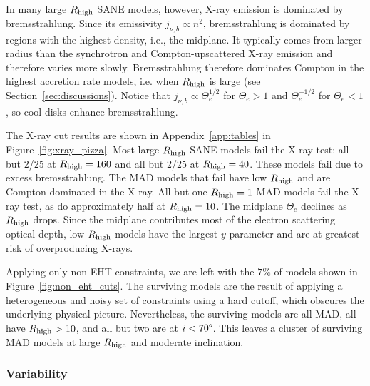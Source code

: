 In many large $R_\mathrm{high}$ SANE models, however, X-ray emission is dominated by bremsstrahlung.
Since its emissivity $j_{\nu,b} \propto n^2$, bremsstrahlung is dominated by regions with the highest density, i.e., the midplane.
It typically comes from larger radius than the synchrotron and Compton-upscattered X-ray emission and therefore varies more slowly.
Bremsstrahlung therefore dominates Compton in the highest accretion rate models, i.e. when $R_\mathrm{high}$ is large (see Section~\ref{sec:discussions}).
Notice that $j_{\nu,b} \propto \Theta_e^{1/2}$ for $\Theta_e > 1$ and $\Theta_e^{-1/2}$ for $\Theta_e < 1$, so cool disks enhance bremsstrahlung.

The X-ray cut results are shown in Appendix~\ref{app:tables} in Figure~\ref{fig:xray_pizza}.
Most large $R_\mathrm{high}$ SANE models fail the X-ray test: all but 2/25 at $R_\mathrm{high} = 160$ and all but 2/25 at $R_\mathrm{high} = 40$.
These models fail due to excess bremsstrahlung.
The MAD models that fail have low $R_\mathrm{high}$ and are Compton-dominated in the X-ray.
All but one $R_\mathrm{high} = 1$ MAD models fail the X-ray test, as do approximately half at $R_\mathrm{high} = 10$.
The midplane $\Theta_e$ declines as $R_\mathrm{high}$ drops.
Since the midplane contributes most of the electron scattering optical depth, low $R_\mathrm{high}$ models have the largest $y$ parameter and are at greatest risk of overproducing X-rays.


Applying only non-EHT constraints, we are left with the $7\%$ of models shown in Figure~\ref{fig:non_eht_cuts}.
The surviving models are the result of applying a heterogeneous and noisy set of constraints using a hard cutoff, which obscures the underlying physical picture.
Nevertheless, the surviving models are all MAD, all have $R_\mathrm{high} > 10$, and all but two are at $i < 70\degree$.
This leaves a cluster of surviving MAD models at large $R_\mathrm{high}$ and moderate inclination.

\subsubsection{Variability}

